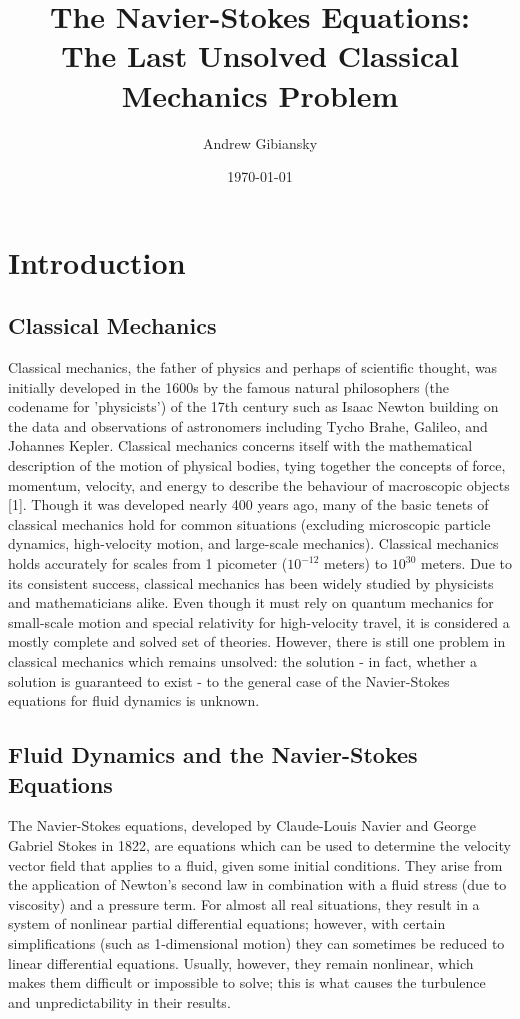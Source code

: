 \documentclass[a4paper]{article}
\title{The Navier-Stokes Equations:\\ The Last Unsolved Classical Mechanics Problem}
\author{Andrew Gibiansky}
\date{\today}
\begin{document}
\maketitle

\section{Introduction}

\subsection{Classical Mechanics}

Classical mechanics, the father of physics and perhaps of scientific thought, was initially developed in the 1600s by the famous natural philosophers (the codename for 'physicists') of the 17th century such as Isaac Newton building on the data and observations of astronomers including Tycho Brahe, Galileo, and Johannes Kepler. Classical mechanics concerns itself with the mathematical description of the motion of physical bodies, tying together the concepts of force, momentum, velocity, and energy to describe the behaviour of macroscopic objects [1]. Though it was developed nearly 400 years ago, many of the basic tenets of classical mechanics hold for common situations (excluding microscopic particle dynamics, high-velocity motion, and large-scale mechanics). Classical mechanics holds accurately for scales from 1 picometer ($10^{-12}$ meters) to $10^{30}$ meters. Due to its consistent success, classical mechanics has been widely studied by physicists and mathematicians alike. Even though it must rely on quantum mechanics for small-scale motion and special relativity for high-velocity travel, it is considered a mostly complete and solved set of theories. However, there is still one problem in classical mechanics which remains unsolved: the solution - in fact, whether a solution is guaranteed to exist - to the general case of the Navier-Stokes equations for fluid dynamics is unknown.

\subsection{Fluid Dynamics and the Navier-Stokes Equations}

The Navier-Stokes equations, developed by Claude-Louis Navier and George Gabriel Stokes in 1822, are equations which can be used to determine the velocity vector field that applies to a fluid, given some initial conditions. They arise from the application of Newton's second law in combination with a fluid stress (due to viscosity) and a pressure term. For almost all real situations, they result in a system of nonlinear partial differential equations; however, with certain simplifications (such as 1-dimensional motion) they can sometimes be reduced to linear differential equations. Usually, however, they remain nonlinear, which makes them difficult or impossible to solve; this is what causes the turbulence and unpredictability in their results. 
\end{document}

